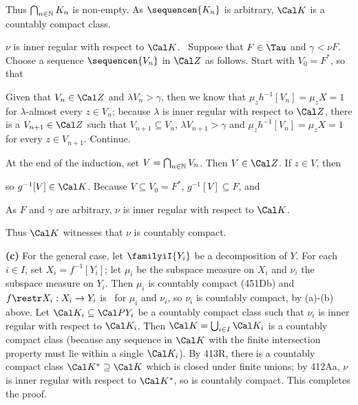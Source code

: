 {

\noindent Thus $\bigcap_{n\in\Bbb N}K_n$ is non-empty.   As
$\sequencen{K_n}$ is arbitrary, $\Cal K$ is a countably compact
class.\ \Qed

\medskip

 $\nu$ is inner regular with respect to $\Cal K$.   \Prf\
Suppose that $F\in\Tau$ and $\gamma<\nu F$.   Choose a sequence
$\sequencen{V_n}$ in $\Cal Z$ as follows.   Start with $V_0=F^*$, so
that


\noindent  Given that $V_n\in\Cal Z$ and $\lambda V_n>\gamma$, then we
know that $\mu_zh^{-1}[V_n]=\mu_zX=1$ for $\lambda$-almost every
$z\in V_n$;
because $\lambda$ is inner regular with respect to $\Cal Z$, there is a
$V_{n+1}\in\Cal Z$ such that $V_{n+1}\subseteq V_n$, $\lambda
V_{n+1}>\gamma$ and $\mu_zh^{-1}[V_n]=\mu_zX=1$ for every $z\in
V_{n+1}$.   Continue.

At the end of the induction, set $V=\bigcap_{n\in\Bbb N}V_n$.   Then
$V\in\Cal Z$.   If $z\in V$, then


\noindent so $g^{-1}[V]\in\Cal K$.   Because $V\subseteq V_0=F^*$,
$g^{-1}[V]\subseteq F$, and


\noindent As $F$ and $\gamma$ are arbitrary, $\nu$ is inner regular with
respect to $\Cal K$.\ \Qed

Thus $\Cal K$ witnesses that $\nu$ is countably compact.

\medskip

{\bf (c)} For the general case, let $\familyiI{Y_i}$ be a decomposition
of $Y$.   For each $i\in I$, set $X_i=f^{-1}[Y_i]$;  let $\mu_i$ be the
subspace measure on $X_i$ and $\nu_i$ the subspace measure on $Y_i$.
Then $\mu_i$ is countably compact (451Db) and $f\restr X_i:X_i\to Y_i$
is \imp\ for $\mu_i$ and $\nu_i$, so $\nu_i$ is countably compact, by
(a)-(b) above.   Let $\Cal K_i\subseteq\Cal PY_i$ be a countably compact
class such that $\nu_i$ is inner regular with respect to $\Cal K_i$.
Then $\Cal K=\bigcup_{i\in I}\Cal K_i$ is a countably compact class
(because any sequence in $\Cal K$ with the finite intersection property
must lie within a single $\Cal K_i$).   By 413R, there is a
countably compact class $\Cal K^*\supseteq\Cal K$ which is closed under
finite unions;  by 412Aa, $\nu$ is inner regular with respect to
$\Cal K^*$, so is countably compact.   This completes the proof.
}%

